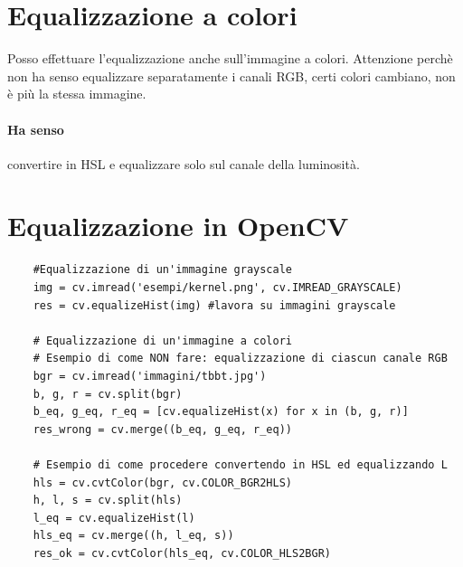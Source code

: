 \section{Equalizzazione a colori}

Posso effettuare l'equalizzazione anche sull'immagine a colori. Attenzione perchè non ha senso equalizzare separatamente i canali RGB, certi colori cambiano, non è più la stessa immagine.
\paragraph{Ha senso} convertire in HSL e equalizzare solo sul canale della luminosità.

\section{Equalizzazione in OpenCV}



\begin{lstlisting}
	#Equalizzazione di un'immagine grayscale
	img = cv.imread('esempi/kernel.png', cv.IMREAD_GRAYSCALE)
	res = cv.equalizeHist(img) #lavora su immagini grayscale
	
	# Equalizzazione di un'immagine a colori
	# Esempio di come NON fare: equalizzazione di ciascun canale RGB
	bgr = cv.imread('immagini/tbbt.jpg')
	b, g, r = cv.split(bgr)
	b_eq, g_eq, r_eq = [cv.equalizeHist(x) for x in (b, g, r)]
	res_wrong = cv.merge((b_eq, g_eq, r_eq))
	
	# Esempio di come procedere convertendo in HSL ed equalizzando L
	hls = cv.cvtColor(bgr, cv.COLOR_BGR2HLS)
	h, l, s = cv.split(hls)
	l_eq = cv.equalizeHist(l)
	hls_eq = cv.merge((h, l_eq, s))
	res_ok = cv.cvtColor(hls_eq, cv.COLOR_HLS2BGR)
\end{lstlisting}